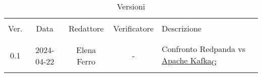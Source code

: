 \documentclass[italian,12pt]{article}
\begin{document}


\newpage



\begin{table}[!h]
	\caption{Versioni}
	\footnotesize
	\begin{center}
		\begin{tabular}{ c c c c p{6.1cm} }
			\hline                                                                              \\[-2ex]
			Ver. & Data       & Redattore   & Verificatore & Descrizione                        \\
			\\[-2ex] \hline \\[-1.5ex]
			0.1  & 2024-04-22 & Elena Ferro & -            & Confronto Redpanda vs \href{https://7last.github.io/docs/rtb/documentazione-interna/glossario#apache-kafka}{Apache Kafka\textsubscript{G}} \\
			\\[-1.5ex] \hline
		\end{tabular}
	\end{center}
\end{table}

\newpage

\tableofcontents

\newpage
















\end{document}
